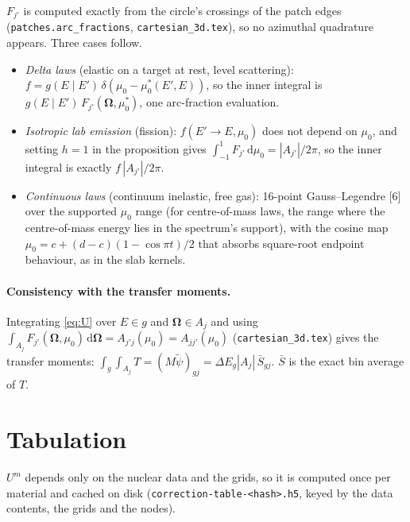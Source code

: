 \documentclass[11pt]{article}
\newcommand{\tpsi}{\tilde\psi}
\newcommand{\Sbar}{\bar S}
\newcommand{\Om}{\boldsymbol\Omega}
\begin{document}
\noindent $F_{j'}$ is computed exactly from the circle's crossings of the patch
edges (\texttt{patches.arc\_fractions}, \texttt{cartesian\_3d.tex}), so no azimuthal
quadrature appears. Three cases follow.
\begin{itemize}
  \item \emph{Delta laws} (elastic on a target at rest, level scattering):
  $f = g(E\mid E')\,\delta(\mu_0-\mu_0^*(E',E))$, so the inner integral is
  $g(E\mid E')\,F_{j'}(\Om,\mu_0^*)$, one arc-fraction evaluation.
  \item \emph{Isotropic lab emission} (fission): $f(E'\!\to E,\mu_0)$ does not
  depend on $\mu_0$, and setting $h=1$ in the proposition gives
  $\int_{-1}^1F_{j'}\,\mathrm d\mu_0 = |A_{j'}|/2\pi$, so the inner integral is
  exactly $f\,|A_{j'}|/2\pi$.
  \item \emph{Continuous laws} (continuum inelastic, free gas): 16-point
  Gauss--Legendre [6] over the supported $\mu_0$ range (for centre-of-mass laws, the
  range where the centre-of-mass energy lies in the spectrum's support), with the
  cosine map $\mu_0 = c + (d-c)(1-\cos\pi t)/2$ that absorbs square-root endpoint
  behaviour, as in the slab kernels.
\end{itemize}

\paragraph{Consistency with the transfer moments.} Integrating \eqref{eq:U} over
$E\in g$ and $\Om\in A_j$ and using
$\int_{A_j}F_{j'}(\Om,\mu_0)\,\mathrm d\Om = A_{j'j}(\mu_0) = A_{jj'}(\mu_0)$
(\texttt{cartesian\_3d.tex}) gives the transfer moments: $\int_g\!\int_{A_j} T =
(M\tpsi)_{gj} = \Delta E_g|A_j|\,\Sbar_{gj}$. $\Sbar$ is the exact bin average of $T$.

\section{Tabulation}

$U^m$ depends only on the nuclear data and the grids, so it is computed once per
material and cached on disk (\texttt{correction-table-<hash>.h5}, keyed by the data
contents, the grids and the nodes).
\end{document}

